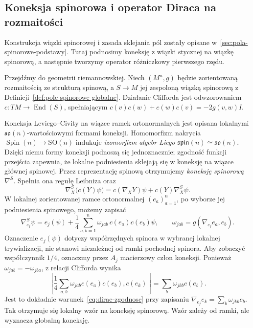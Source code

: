 \subsection{Koneksja spinorowa i operator Diraca na rozmaitości}
\label{subsec:dirac-koneksja}

Konstrukcja wiązki spinorowej i zasada sklejania pól
zostały opisane w~\ref{sec:pola-spinorowe-podstawy}.
Tutaj podnosimy koneksję z wiązki stycznej na
wiązkę spinorową, a następnie tworzymy operator
różniczkowy pierwszego rzędu.

Przejdźmy do geometrii riemannowskiej. Niech $(M^n,g)$
będzie zorientowaną rozmaitością ze strukturą spinową,
a $S\to M$ jej zespoloną wiązką spinorową z
Definicji~\ref{def:pole-spinorowe-globalne}.
Działanie Clifforda jest odwzorowaniem
$c:TM\to\operatorname{End}(S)$, spełniającym
$c(v)c(w)+c(w)c(v)=-2g(v,w)I$.

Koneksja Leviego--Civity na wiązce ramek ortonormalnych
jest opisana lokalnymi $\mathfrak{so}(n)$-wartościowymi
formami koneksji. Homomorfizm nakrycia
$\operatorname{Spin}(n)\to\mathrm{SO}(n)$ indukuje
\emph{izomorfizm algebr Liego} $\mathfrak{spin}(n)
\simeq\mathfrak{so}(n)$. Dzięki niemu formy koneksji
podnoszą się jednoznacznie; zgodność funkcji przejścia
zapewnia, że lokalne podniesienia sklejają się w koneksję
na wiązce głównej spinowej. Przez reprezentację spinową
otrzymujemy \emph{koneksję spinorową} $\nabla^S$.
Spełnia ona regułę Leibniza oraz
\begin{equation}\label{eq:dirac-zgodnosc}
 \nabla^S_X\bigl(c(Y)\psi\bigr)
 =c(\nabla_XY)\psi+c(Y)\nabla^S_X\psi.
\end{equation}
W lokalnej zorientowanej ramce ortonormalnej
$(e_a)_{a=1}^n$, po wyborze jej podniesienia spinowego,
możemy zapisać
\begin{equation}\label{eq:dirac-koneksja-lokalna}
 \nabla^S_{e_j}\psi
 =e_j(\psi)+\frac14\sum_{a,b=1}^n
 \omega_{jab}\,c(e_a)c(e_b)\psi,
 \qquad
 \omega_{jab}=g(\nabla_{e_j}e_a,e_b).
\end{equation}
Oznaczenie $e_j(\psi)$ dotyczy współrzędnych spinora
w wybranej lokalnej trywializacji, nie stanowi
niezależnej od ramki pochodnej spinora.
Aby zobaczyć współczynnik $1/4$, oznaczmy przez $A_j$
macierzowy człon koneksji. Ponieważ
$\omega_{jab}=-\omega_{jba}$, z relacji Clifforda
wynika
\[
 \left[\frac14\sum_{a,b}\omega_{jab}c(e_a)c(e_b),
 c(e_k)\right]=\sum_b\omega_{jkb}c(e_b).
\]
Jest to dokładnie warunek~\eqref{eq:dirac-zgodnosc}
przy zapisaniu $\nabla_{e_j}e_k=\sum_b\omega_{jkb}e_b$.
Tak otrzymuje się lokalny wzór na koneksję spinorową.
Wzór zależy od ramki, ale wyznacza globalną koneksję.


